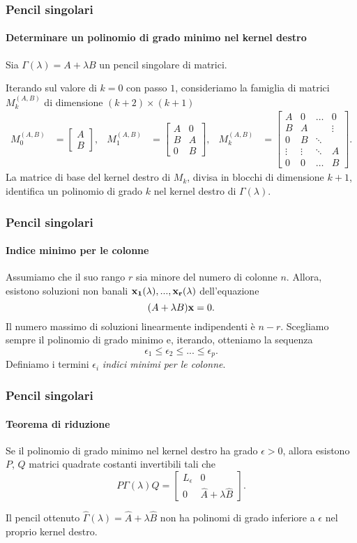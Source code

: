 \begin{frame}
	\frametitle{Pencil singolari}
	\framesubtitle{Determinare un polinomio di grado minimo nel kernel destro}
	Sia \(\Gamma(\lambda)=A+\lambda B\) un pencil singolare di matrici.

	Iterando sul valore di $k = 0$ con passo $1$, consideriamo la famiglia di matrici
	$M_k^{(A, B)}$ di dimensione $(k+2) \times (k+1)$
	\begin{align*}
		M_{0}^{(A, B)} &=
			\left[\begin{smallmatrix}
				A \\
				B
			\end{smallmatrix}\right],
		& M_{1}^{(A, B)} &=
			\left[\begin{smallmatrix}
				A & 0 \\
				B & A \\
				0 & B
			\end{smallmatrix}\right],
		& M_{k}^{(A, B)} &=
			\left[\begin{smallmatrix}
				A & 0 & \hdots &    0   \\
				B & A &        & \vdots \\
				0 & B & \ddots & \\
				\vdots & \vdots & \ddots & A \\
				0      &    0   & \hdots & B
			\end{smallmatrix}\right].
	\end{align*}
	\onslide<2-> La matrice di base del kernel destro di $M_k$, divisa in blocchi di
	dimensione $k+1$, identifica un polinomio di grado $k$ nel kernel destro di
	$\Gamma(\lambda)$.
\end{frame}


\begin{frame}
	\frametitle{Pencil singolari}
	\framesubtitle{Indice minimo per le colonne}
	Assumiamo che il suo rango $r$ sia minore del numero di colonne $n$. Allora,
	esistono soluzioni non banali $\vb{x_1}(\lambda), ..., \vb{x_r}(\lambda)$ dell'equazione
	\[
		(A+\lambda B)\vb{x} = 0.
	\]
	\onslide<2-> Il numero massimo di soluzioni linearmente indipendenti \`e $n-r$. Scegliamo
	sempre il polinomio di grado minimo e, iterando, otteniamo la sequenza
	\[
		\epsilon_{1} \leq \epsilon_{2} \leq ... \leq \epsilon_{p}.
	\]
	Definiamo i termini $\epsilon_i$ \emph{indici minimi per le colonne}.
\end{frame}


\begin{frame}
	\frametitle{Pencil singolari}
	\framesubtitle{Teorema di riduzione}
	\begin{theorem}
		Se il polinomio di grado minimo nel kernel destro ha grado $\epsilon > 0$, allora esistono
		$P$, $Q$ matrici quadrate costanti invertibili tali che
		\[
			P\Gamma(\lambda)Q=\begin{bmatrix}
				L_{\epsilon} & 0 \\
				0 & \widehat{A} + \lambda \widehat{B}
			\end{bmatrix}.
		\]
	\end{theorem}
	 Il pencil ottenuto $\widehat{\Gamma}(\lambda) = \widehat{A} + \lambda \widehat{B}$
	non ha polinomi di grado inferiore a $\epsilon$ nel proprio kernel destro.
\end{frame}